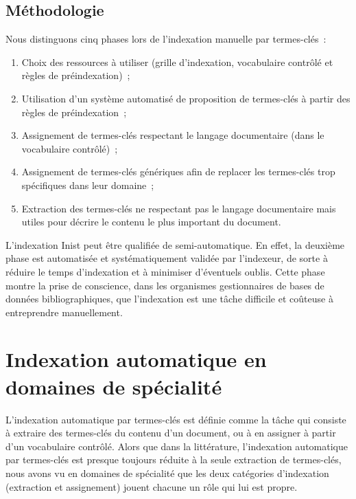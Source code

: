   \subsection{Méthodologie}
  \label{subsec:main-domain_specific_keyphrase_annotation-manual_keyphrase_annotation-methodology}
    Nous distinguons cinq phases lors de l'indexation manuelle par
    termes-clés~:
    \begin{enumerate}
      \item{Choix des ressources à utiliser (grille d'indexation, vocabulaire
            contrôlé et règles de préindexation)~;}
      \item{Utilisation d'un système automatisé de proposition de termes-clés
            à partir des règles de préindexation~;}
      \item{Assignement de termes-clés respectant le langage documentaire
            (dans le vocabulaire contrôlé)~;}
      \item{Assignement de termes-clés génériques afin de replacer les
            termes-clés trop spécifiques dans leur domaine~;}
      \item{Extraction des termes-clés ne respectant pas le langage
            documentaire mais utiles pour décrire le contenu le plus important
            du document.}
    \end{enumerate}

    L'indexation Inist peut être qualifiée de semi-automatique. En effet, la
    deuxième phase est automatisée et systématiquement validée par l'indexeur,
    de sorte à réduire le temps d'indexation et à minimiser d'éventuels
    oublis. Cette phase montre la prise de conscience, dans les organismes
    gestionnaires de bases de données bibliographiques, que l'indexation est
    une tâche difficile et coûteuse à entreprendre manuellement.


\section{Indexation automatique en domaines de spécialité}
\label{sec:main-domain_specific_keyphrase_annotation-supervised_automatic_keyphrase_extraction}
  L'indexation automatique par termes-clés est définie comme la tâche qui
  consiste à extraire des termes-clés du contenu d'un document, ou à en
  assigner à partir d'un vocabulaire contrôlé. Alors que dans la
  littérature, l'indexation automatique par termes-clés est presque toujours réduite à la
  seule extraction de termes-clés, nous avons vu en domaines de spécialité
  que les deux catégories d'indexation (extraction et assignement) jouent
  chacune un rôle qui lui est propre.

